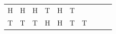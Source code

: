 {{\begin{center}
\begin{tabular}[t]{|l|l|l|l|l|l|l|l|l|l|}
        H &
        H &
        H &
        T &
        H &
        T%
     \tabularnewline\cline{1-1}\cline{2-2}\cline{3-3}\cline{4-4}\cline{5-5}\cline{6-6}\cline{7-7}\cline{8-8}\cline{9-9}\cline{10-10}
        T &
        T &
        T &
        H &
        H &
        T &
        T &

\end{tabular}
\end{center}}}
